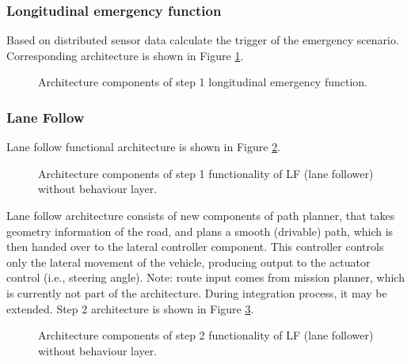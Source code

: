 \documentclass[sn-mathphys-num]{sn-jnl}%
\begin{document}
\subsubsection{Longitudinal emergency function}
Based on distributed sensor data calculate the trigger of the emergency scenario. Corresponding architecture is shown in Figure \ref{fig:em_step1}.
\begin{figure}[h]
    \caption{Architecture components of step 1 longitudinal emergency function.}
    \label{fig:em_step1}
\end{figure}

\subsubsection{Lane Follow}
Lane follow functional architecture is shown in Figure \ref{fig:lat_step1}.
\begin{figure}[h]
    \caption{Architecture components of step 1 functionality of LF (lane follower) without behaviour layer.}
    \label{fig:lat_step1}
\end{figure}
Lane follow architecture consists of new components of path planner, that takes geometry information of the road, and plans a smooth (drivable) path, 
which is then handed over to the lateral controller component. This controller controls only the lateral movement of the vehicle, producing output to the 
actuator control (i.e., steering angle).
Note: route input comes from mission planner, which is currently not part of the architecture. During integration process, it may be extended.
Step 2 architecture is shown in Figure \ref{fig:lat_step2}.
\begin{figure}[h]
    \caption{Architecture components of step 2 functionality of LF (lane follower) without behaviour layer.}
    \label{fig:lat_step2}
\end{figure}
\end{document}
